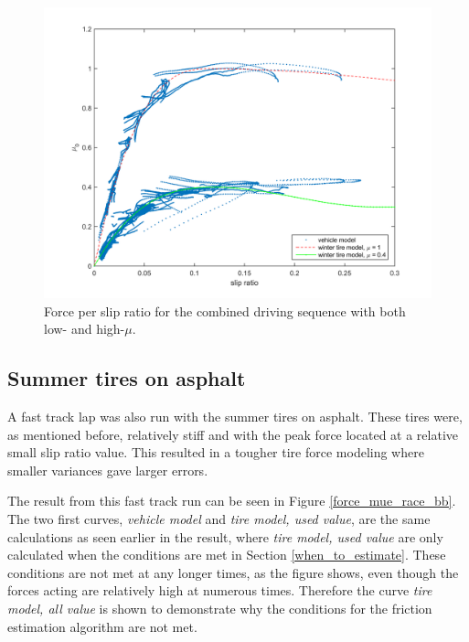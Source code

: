 \begin{figure}[h]
	\centering
	\includegraphics[width=1.0\textwidth]{Pictures/slip_kraft_comb2}
	\caption {Force per slip ratio for the combined driving sequence with both low- and high-$ \mu $.}
	\label{slip_kraft_comb2}
\end{figure}

\subsection{Summer tires on asphalt}
A fast track lap was also run with the summer tires on asphalt. These tires were, as mentioned before, relatively stiff and with the peak force located at a relative small slip ratio value. This resulted in a tougher tire force modeling where smaller variances gave larger errors. 

The result from this fast track run can be seen in Figure \ref{force_mue_race_bb}. The two first curves, \textit{vehicle model} and \textit{tire model, used value}, are the same calculations as seen earlier in the result, where \textit{tire model, used value} are only calculated when the conditions are met in Section \ref{when_to_estimate}. These conditions are not met at any longer times, as the figure shows, even though the forces acting are relatively high at numerous times. Therefore the curve \textit{tire model, all value} is shown to demonstrate why the conditions for the friction estimation algorithm are not met.


